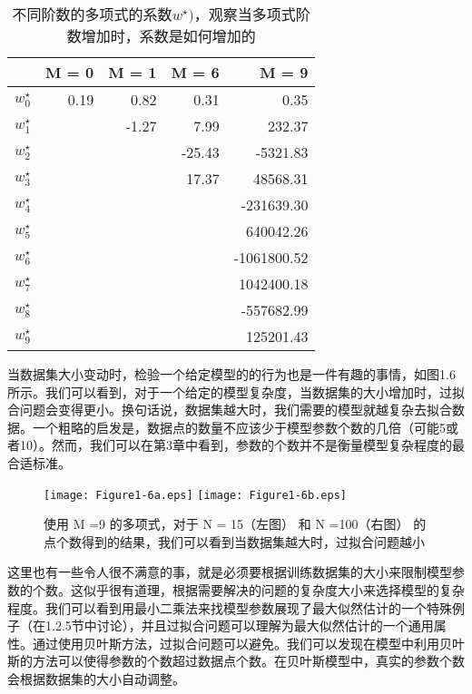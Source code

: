 	\begin{table}[b]
		\parbox{.3\textwidth}{\caption{不同阶数的多项式的系数$w^{\star})$，观察当多项式阶数增加时，系数是如何增加的}}
		\parbox{.5\textwidth}{
		\begin{tabular}{r|rrrr}
			& M = 0 & M = 1 & M = 6 & M = 9\\
			\hline
			$w_0^{\star}$ & 0.19 & 0.82 & 0.31 & 0.35 \\
			$w_1^{\star}$ &      & -1.27 & 7.99 & 232.37 \\
			$w_2^{\star}$ &      &       & -25.43 & -5321.83 \\
			$w_3^{\star}$ &  	 & 		 & 17.37 & 48568.31 \\
			$w_4^{\star}$ & 	 & 		 &  	 & -231639.30 \\
			$w_5^{\star}$ & 	 &  	 & 		& 640042.26 \\
			$w_6^{\star}$ & 	 &  	 &  	& -1061800.52 \\
			$w_7^{\star}$ &  	 &  	 &  	& 1042400.18 \\
			$w_8^{\star}$ &  	 &  	 & 		& -557682.99 \\
			$w_9^{\star}$ &  	 & 		 &		&  125201.43
			
		\end{tabular}
	}
	\end{table}
	
	当数据集大小变动时，检验一个给定模型的的行为也是一件有趣的事情，如图1.6所示。我们可以看到，对于一个给定的模型复杂度，当数据集的大小增加时，过拟合问题会变得更小。换句话说，数据集越大时，我们需要的模型就越复杂去拟合数据。一个粗略的启发是，数据点的数量不应该少于模型参数个数的几倍（可能5或者10）。然而，我们可以在第3章中看到，参数的个数并不是衡量模型复杂程度的最合适标准。
	
	\begin{figure}
		
		\texttt{[image: Figure1-6a.eps]}
		\texttt{[image: Figure1-6b.eps]}

		\caption{使用 M =9 的多项式，对于 N = 15（左图） 和 N =100（右图） 的点个数得到的结果，我们可以看到当数据集越大时，过拟合问题越小} 
		\label{fig:endb-flow} 
	\end{figure}
	
	这里也有一些令人很不满意的事，就是必须要根据训练数据集的大小来限制模型参数的个数。这似乎很有道理，根据需要解决的问题的复杂度大小来选择模型的复杂程度。我们可以看到用最小二乘法来找模型参数展现了最大似然估计的一个特殊例子（在1.2.5节中讨论），并且过拟合问题可以理解为最大似然估计的一个通用属性。通过使用贝叶斯方法，过拟合问题可以避免。我们可以发现在模型中利用贝叶斯的方法可以使得参数的个数超过数据点个数。在贝叶斯模型中，真实的参数个数会根据数据集的大小自动调整。
	
